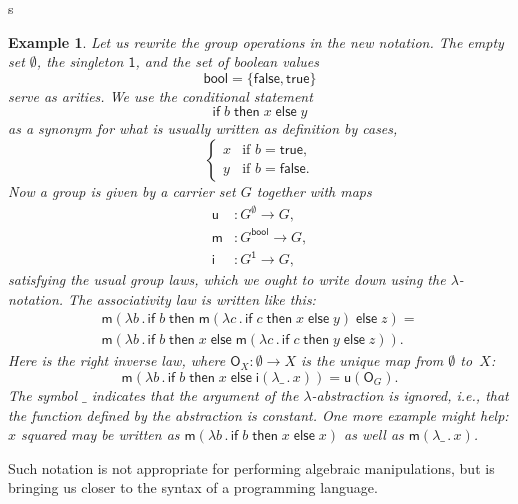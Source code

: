 s\documentclass{amsart}
\newcommand{\set}[1]{\{#1\}} %
\newcommand{\lam}[1]{\lambda #1 \,.\,}
\newcommand{\one}{\mathsf{1}} %
\newcommand{\bool}{\mathsf{bool}} %
\newcommand{\true}{\mathsf{true}}
\newcommand{\false}{\mathsf{false}}
\newcommand{\cond}[3]{\mathsf{if}\;#1\;\mathsf{then}\;#2\;\mathsf{else}\;#3}
\newtheorem{example}[definition]{Example}
\begin{document}
\begin{example}
  Let us rewrite the group operations in the new notation. The empty set
  $\emptyset$, the singleton $\one$, and the set of boolean values
  \begin{equation*}
    \bool = \set{\false, \true}
  \end{equation*}
  serve as arities. We use the conditional statement
  \begin{equation*}
    \cond{b}{x}{y}
  \end{equation*}
  as a synonym for what is usually written as definition by cases,
  \begin{equation*}
  \begin{cases}
      x & \text{if $b = \true$,}\\
      y & \text{if $b = \false$.}
    \end{cases}
  \end{equation*}
  Now a group is given by a carrier set $G$ together with maps
  \begin{align*}
    \mathsf{u} &: G^\emptyset \to G,\\
    \mathsf{m} &: G^\bool \to G,\\
    \mathsf{i} &: G^\one \to G,
  \end{align*}
  satisfying the usual group laws, which we ought to write down using the
  $\lambda$-notation. The associativity law is written like this:
  \begin{multline*}
    \mathsf{m}(\lam{b} \cond{b}{\mathsf{m}(\lam{c}\cond{c}{x}{y})}{z}) = \\
    \mathsf{m}(\lam{b} \cond{b}{x}{\mathsf{m}(\lam{c} \cond{c}{y}{z})}).
  \end{multline*}
  Here is the right inverse law, where $\mathsf{O}_X : \emptyset \to X$ is
  the unique map from $\emptyset$ to~$X$:
  \begin{equation*}
    \mathsf{m}(\lam{b} \cond{b}{x}{\mathsf{i}(\lam{\_}{x})}) =
    \mathsf{u}(\mathsf{O}_G).
  \end{equation*}
  The symbol $\_$ indicates that the argument of the $\lambda$-abstraction is
  ignored, i.e., that the function defined by the abstraction is constant. One
  more example might help: $x$ squared may be written as
  $\mathsf{m}(\lam{b} \cond{b}{x}{x})$ as well as $\mathsf{m}(\lam{\_} x)$.
\end{example}

Such notation is not appropriate for performing algebraic manipulations, but is
bringing us closer to the syntax of a programming language.
\end{document}
